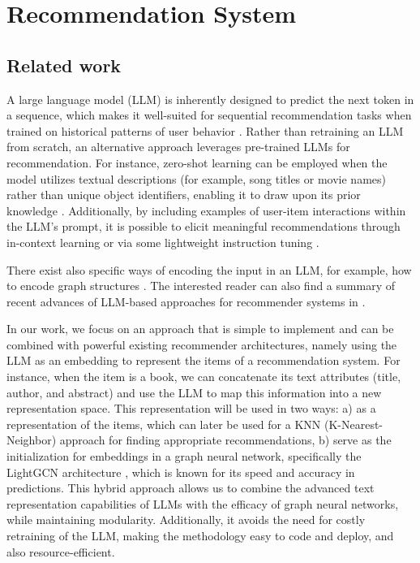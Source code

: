 \section{Recommendation System}\label{sec:recommendation}

\subsection{Related work}
\label{subsec:rs_related_work}

A large language model (LLM) is inherently designed to predict the next token in a sequence, which makes it well-suited for sequential recommendation tasks when trained on historical patterns of user behavior \cite{P52022, li2023text}. Rather than retraining an LLM from scratch, an alternative approach leverages pre-trained LLMs for recommendation. For instance, zero-shot learning can be employed when the model utilizes textual descriptions (for example, song titles or movie names) rather than unique object identifiers, enabling it to draw upon its prior knowledge \cite{sanner2023large}. Additionally, by including examples of user-item interactions within the LLM's prompt, it is possible to elicit meaningful recommendations through in-context learning \cite{xu2024prompting} or via some lightweight instruction tuning \cite{bao2023tallrec}.

There exist also specific ways of encoding the input in an LLM, for example, how to encode graph structures \cite{tang2024graphgpt}. The interested reader can also find a summary of recent advances of LLM-based approaches for recommender systems in \cite{deldjoo2024review, zhao2024recommender}.

In our work, we focus on an approach that is simple to implement and can be combined with powerful existing recommender architectures, namely using the LLM as an embedding to represent the items of a recommendation system. For instance, when the item is a book, we can concatenate its text attributes (title, author, and abstract) and use the LLM to map this information into a new representation space.
This representation will be used in two ways: a) as a representation of the items, which can later be used for a KNN (K-Nearest-Neighbor) approach for finding appropriate recommendations, b) serve as the initialization for embeddings in a graph neural network, specifically the LightGCN architecture \cite{lightgcn}, which is known for its speed and accuracy in predictions. This hybrid approach allows us to combine the advanced text representation capabilities of LLMs with the efficacy of graph neural networks, while maintaining modularity. Additionally, it avoids the need for costly retraining of the LLM, making the methodology easy to code and deploy, and also resource-efficient.


